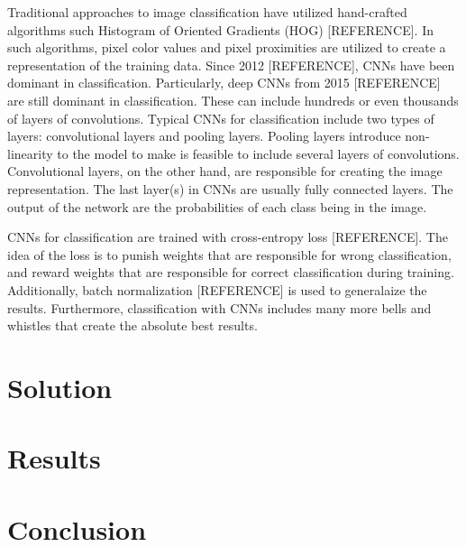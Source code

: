 \documentclass{article}
\begin{document}
Traditional approaches to image classification have utilized
hand-crafted algorithms such Histogram of Oriented Gradients (HOG)
[REFERENCE]. In such algorithms, pixel color values and pixel
proximities are utilized to create a representation of the training
data. Since 2012 [REFERENCE], CNNs have been dominant in
classification. Particularly, deep CNNs from 2015 [REFERENCE] are
still dominant in classification. These can include hundreds or even
thousands of layers of convolutions. Typical CNNs for classification
include two types of layers: convolutional layers and pooling layers.
Pooling layers introduce non-linearity to the model to make is
feasible to include several layers of convolutions. Convolutional
layers, on the other hand, are responsible for creating the image
representation. The last layer(s) in CNNs are usually fully connected
layers. The output of the network are the probabilities of each class
being in the image.

CNNs for classification are trained with cross-entropy loss
[REFERENCE]. The idea of the loss is to punish weights that are
responsible for wrong classification, and reward weights that are
responsible for correct classification during training. Additionally,
batch normalization [REFERENCE] is used to generalaize the results.
Furthermore, classification with CNNs includes many more bells and
whistles that create the absolute best results.

\section{Solution}

\section{Results}\label{sec:results}

\section{Conclusion}\label{sec:conclusion}

\small




%

\vfill\pagebreak
\end{document}
